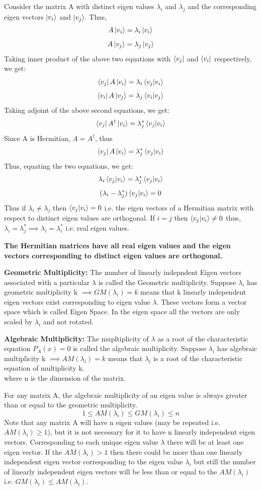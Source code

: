 \begin{itemize}
    Consider the matrix A with distinct eigen values $\lambda_i$ and $\lambda_j$ and the corresponding eigen vectors $\ket{v_i}$ and $\ket{v_j}$. Thus,
    \[ A\ket{v_i}=\lambda_i\ket{v_i} \]
    \[ A\ket{v_j}=\lambda_j\ket{v_j} \]
    Taking inner product of the above two equations with $\bra{v_j}$ and $\bra{v_i}$ respectively, we get:
    \[ \bra{v_j}A\ket{v_i}=\lambda_i\braket{v_j|v_i} \]
    \[ \bra{v_i}A\ket{v_j}=\lambda_j\braket{v_i|v_j} \]
    Taking adjoint of the above second equations, we get:
    \[ \bra{v_j}A^{\dagger}\ket{v_i}=\lambda_j^*\braket{v_j|v_i} \]
    Since A is Hermitian, $A=A^{\dagger}$, thus
    \[ \bra{v_j}A\ket{v_i}=\lambda_j^*\braket{v_j|v_i} \]
    Thus, equating the two equations, we get:
    \[ \lambda_i\braket{v_j|v_i}=\lambda_j^*\braket{v_j|v_i} \]
    \[ (\lambda_i-\lambda_j^*)\braket{v_j|v_i}=0 \]
    Thus if $\lambda_i \neq \lambda_j$ then $\braket{v_j|v_i}=0$ i.e. the eigen vectors of a Hermitian matrix with respect to distinct eigen values are orthogonal.
    If $i=j$ then $\braket{v_j|v_i} \neq 0$ thus, $\lambda_i=\lambda_j^* \implies \lambda_i=\lambda_i^*$ i.e. real eigen values.  

    \textbf{The Hermitian matrices have all real eigen values and the eigen vectors corresponding to distinct eigen values are orthogonal.}

\end{itemize}
\begin{definition}
\textbf{Geometric Multiplicity: }
The number of linearly indepndent Eigen vectors associated with a particular $\lambda$ is called
the Geometric multiplicity. Suppose
$\lambda_i$ has geometric multiplicity k $\implies GM(\lambda_i)=k$ means that k linearly independent eigen vectors exist corresponding 
to eigen value $\lambda$. These vectors form a vector space which is called Eigen Space. In the eigen space all the vectors are only scaled by $\lambda_i$ and not rotated.
\end{definition}
\begin{definition} \textbf{Algebraic Multiplicity: }
The mupltiplicity of $\lambda$ as a root of the characteristic equation $P_A(x)=0$ is called the algebraic multiplicity. Suppose $\lambda_i$ has algebraic multiplicity k $\implies AM(\lambda_i)=k$ means that $\lambda_i$ is a root of the characteristic equation of multiplicity k.\\
where n is the dimension of the matrix.
\end{definition}
For any matrix A, the algebraic multiplicity of an eigen value is always greater than or equal to the geometric multiplicity.\\
\[1 \leq AM(\lambda_i) \leq GM(\lambda_i) \leq n\]
Note that any matrix A will have n eigen values (may be repeated i.e. $AM(\lambda_i) \geq 1$), but it is not necessary for it to have n linearly independent eigen vectors. 
Corresponding to each unique eigen value $\lambda$ there will be at least one eigen vector. If the $AM(\lambda_i)>1$ then 
there could be more than one linearly independent eigen vector corresponding to the eigen value $\lambda_i$ but still the number of linearly independent eigen vectors
will be less than or equal to the $AM(\lambda_i)$ i.e. $GM(\lambda_i)\leq AM(\lambda_i)$.\\ 


